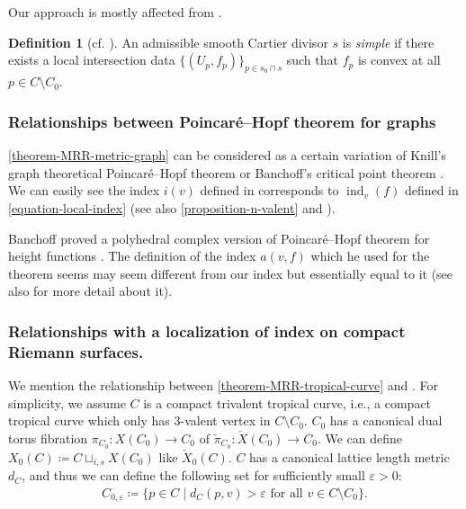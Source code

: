 \documentclass[a4paper,dvipdfmx,reqno,12pt]{amsart}
\theoremstyle{definition}
\newtheorem{definition}[theorem]{Definition}
\newcommand{\deq}{\coloneqq}
\newcommand{\vep}{\varepsilon}%
\newcommand{\opn}[1]{\operatorname{#1}}
\numberwithin{equation}{section}
\begin{document}
Our approach is mostly affected from 
\cite{auroux2022lagrangian}.

\begin{definition}[{cf. \cite{auroux2022lagrangian}}]
An admissible smooth Cartier divisor $s$ is 
\emph{simple} if there exists a local intersection data
$\{(U_p,f_p)\}_{p\in s_0\cap s}$ such that
$f_p$ is convex at all $p\in C\setminus C_0$.
\end{definition}

\subsubsection{Relationships between 
Poincar\'e--Hopf theorem for graphs}

\cref{theorem-MRR-metric-graph} can be considered 
as a certain variation of Knill's graph 
theoretical Poincar\'e--Hopf theorem \cite{knill2012graph}
or 
Banchoff's critical point theorem \cite{MR225327}.
We can easily see the index $i(v)$ defined in 
\cite[3]{knill2012graph}
corresponds to $\opn{ind}_v(f)$ defined in 
\cref{equation-local-index} (see also 
\cref{proposition-n-valent} and \cite[7]{knill2012graph}).

Banchoff proved a polyhedral complex version of Poincar\'e--Hopf theorem
for height functions \cite[Theorem 1]{MR225327}.
The definition of the index $a(v,f)$ 
\cite[p.246]{MR225327} which 
he used for the theorem seems may seem different 
from our index but essentially equal to it
(see also \cite[p.143-144]{grunert2017piecewise} 
for more detail about it).





\subsubsection{Relationships with a localization of 
index on compact Riemann surfaces.}

We mention the relationship between 
\cref{theorem-MRR-tropical-curve} and
\cite[6]{MR2676658}.
For simplicity,
we assume $C$ is a compact trivalent tropical curve, i.e.,
a compact tropical curve which only has $3$-valent
vertex in $C\setminus C_0$.  
$C_0$ has a canonical dual torus fibration 
$\pi_{C_0}\colon X(C_0)\to C_0$ of
$\check{\pi}_{C_0} \colon \check{X}(C_0)\to C_0$.
We can define $X_0(C)\deq C\sqcup_{i,s} X(C_0)$ like
$\check{X}_0(C)$.
$C$ has a canonical lattice length metric $d_{C}$, and
thus we can define the following set for sufficiently small
$\vep >0$: 
\begin{align}
C_{0,\vep}\deq \{p\in C\mid d_C(p,v)>\vep 
\text{ for all } v\in C\setminus C_0\}.
\end{align}
\end{document}
